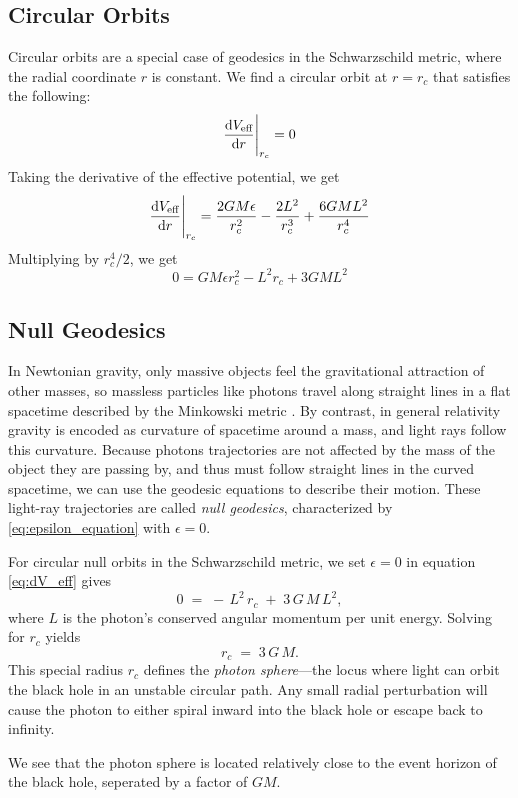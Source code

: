 \documentclass[12pt]{article}
\begin{document}
\subsection{Circular Orbits}
Circular orbits are a special case of geodesics in the Schwarzschild metric, where the radial coordinate \(r\) is constant.
We find a circular orbit at $r = r_{c}$ that satisfies the following:
\[
	\dv{V_{\text{eff}}}{r}\Bigg|_{r_{c}} = 0
\]
Taking the derivative of the effective potential, we get
\begin{equation}\label{eq:dV_eff}
	\dv{V_{\text{eff}}}{r}\Bigg|_{r_{c}} = \frac{2GM\epsilon}{r_{c}^{2}} - \frac{2L^{2}}{r_{c}^{3}} + \frac{6GM L^{2}}{r_{c}^{4}}
\end{equation}
Multiplying by $r_{c}^{4}/2$, we get
\[
	0 = GM\epsilon r_{c}^{2} - L^{2} r_{c} + 3GM L^{2}
\]

\subsection{Null Geodesics}

In Newtonian gravity, only massive objects feel the gravitational attraction of other masses, so massless particles like photons travel along straight lines in a flat spacetime described by the Minkowski metric \cite{carrol2019spacetime}.  
By contrast, in general relativity gravity is encoded as curvature of spacetime around a mass, and light rays follow this curvature.  
Because photons trajectories are not affected by the mass of the object they are passing by, and thus must follow straight lines in the curved spacetime, we can use the geodesic equations to describe their motion.
These light-ray trajectories are called \emph{null geodesics}, characterized by \ref{eq:epsilon_equation} with \(\epsilon = 0\).

For circular null orbits in the Schwarzschild metric, we set \(\epsilon=0\) in equation \ref{eq:dV_eff} gives
\[
0 \;=\; -\,L^{2}\,r_{c} \;+\; 3\,G\,M\,L^{2},
\]
where \(L\) is the photon's conserved angular momentum per unit energy.  
Solving for \(r_{c}\) yields
\[
r_{c} \;=\; 3\,G\,M.
\]
This special radius \(r_{c}\) defines the \emph{photon sphere}—the locus where light can orbit the black hole in an unstable circular path. 
Any small radial perturbation will cause the photon to either spiral inward into the black hole or escape back to infinity.

We see that the photon sphere is located relatively close to the event horizon of the black hole, seperated by a factor of \(GM\).
\end{document}
